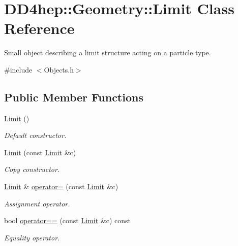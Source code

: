 \hypertarget{class_d_d4hep_1_1_geometry_1_1_limit}{
\section{DD4hep::Geometry::Limit Class Reference}
\label{class_d_d4hep_1_1_geometry_1_1_limit}
}


Small object describing a limit structure acting on a particle type.  


{\ttfamily \#include $<$Objects.h$>$}\subsection*{Public Member Functions}
\begin{DoxyCompactItemize}
\item 
\hyperlink{class_d_d4hep_1_1_geometry_1_1_limit_af8c3f725caf1e3b50b86e2dbfefad3e1}{Limit} ()
\begin{DoxyCompactList}\small\item\em Default constructor. \item\end{DoxyCompactList}\item 
\hyperlink{class_d_d4hep_1_1_geometry_1_1_limit_a60ce84b00fb40254e489228e52db8aab}{Limit} (const \hyperlink{class_d_d4hep_1_1_geometry_1_1_limit}{Limit} \&c)
\begin{DoxyCompactList}\small\item\em Copy constructor. \item\end{DoxyCompactList}\item 
\hyperlink{class_d_d4hep_1_1_geometry_1_1_limit}{Limit} \& \hyperlink{class_d_d4hep_1_1_geometry_1_1_limit_a552afa647ac82252e601c3cd02d41e21}{operator=} (const \hyperlink{class_d_d4hep_1_1_geometry_1_1_limit}{Limit} \&c)
\begin{DoxyCompactList}\small\item\em Assignment operator. \item\end{DoxyCompactList}\item 
bool \hyperlink{class_d_d4hep_1_1_geometry_1_1_limit_a02a35ca283850ec644b0453f69416537}{operator==} (const \hyperlink{class_d_d4hep_1_1_geometry_1_1_limit}{Limit} \&c) const 
\begin{DoxyCompactList}\small\item\em Equality operator. \item\end{DoxyCompactList}\item 

\end{DoxyCompactItemize}
